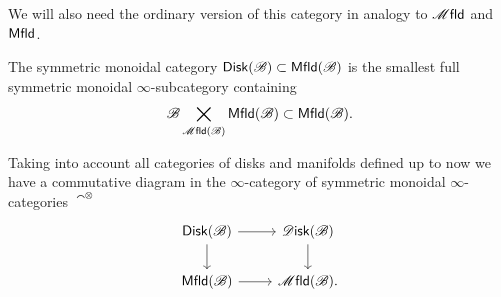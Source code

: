 \documentclass[../text]{subfiles}
\begin{document}
We will also need the ordinary version of this category in analogy to $\mfld$ and $\mfld[r]$.

\begin{definition}
    The symmetric monoidal category $\disk[r](\bstr) \subset \mfld[r](\bstr)$ is the smallest full symmetric monoidal $\infty$-subcategory containing 
    \begin{equation}
        \bstr \bigtimes\limits_{\mfld(\bstr)} \mfld[r](\bstr) \subset \mfld[r](\bstr).
    \end{equation}
\end{definition}

\begin{remark}
    Taking into account all categories of disks and manifolds defined up to now we have a commutative diagram in the $\infty$-category of symmetric monoidal $\infty$-categories $\cat^{\otimes}$
    \begin{equation}
        \begin{tikzcd}
            \disk[r](\bstr) \arrow[r] \arrow[d] & \disk (\bstr) \arrow[d] \\
            \mfld[r] (\bstr) \arrow[r] & \mfld (\bstr).
        \end{tikzcd}
    \end{equation}
\end{remark}
\end{document}
